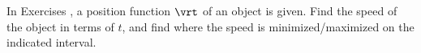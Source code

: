 {\noindent In Exercises}
{ , a position function $\vrt$ of an object is given. Find the speed of the object in terms of $t$, and find where the speed is minimized/maximized on the indicated interval.
}
